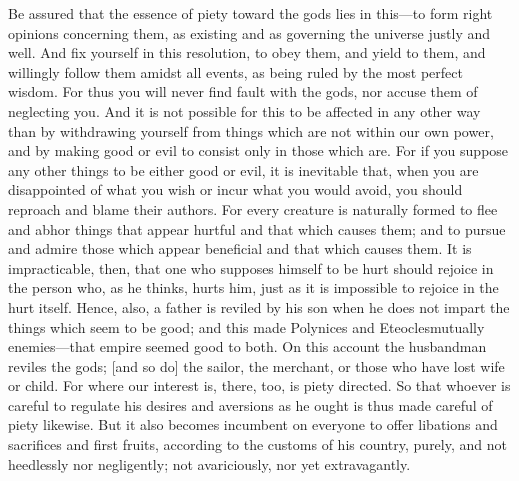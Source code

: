 Be assured that the essence of piety toward the gods lies in this---to form
right opinions concerning them, as existing and as governing the universe
justly and well. And fix yourself in this resolution, to obey them, and
yield to them, and willingly follow them amidst all events, as being
ruled by the most perfect wisdom. For thus you will never find fault with
the gods, nor accuse them of neglecting you. And it is not possible for
this to be affected in any other way than by withdrawing yourself from
things which are not within our own power, and by making good or evil to
consist only in those which are. For if you suppose any other things to
be either good or evil, it is inevitable that, when you are disappointed
of what you wish or incur what you would avoid, you should reproach and
blame their authors. For every creature is naturally formed to flee and
abhor things that appear hurtful and that which causes them; and to
pursue and admire those which appear beneficial and that which causes
them. It is impracticable, then, that one who supposes himself to be hurt
should rejoice in the person who, as he thinks, hurts him, just as it is
impossible to rejoice in the hurt itself. Hence, also, a father is
reviled by his son when he does not impart the things which seem to be
good; and this made Polynices and Eteocles\footnotemark mutually enemies---that
empire seemed good to both. On this account the husbandman reviles the
gods; [and so do] the sailor, the merchant, or those who have lost wife
or child. For where our interest is, there, too, is piety directed. So
that whoever is careful to regulate his desires and aversions as he ought
is thus made careful of piety likewise. But it also becomes incumbent on
everyone to offer libations and sacrifices and first fruits, according to
the customs of his country, purely, and not heedlessly nor negligently;
not avariciously, nor yet extravagantly.
